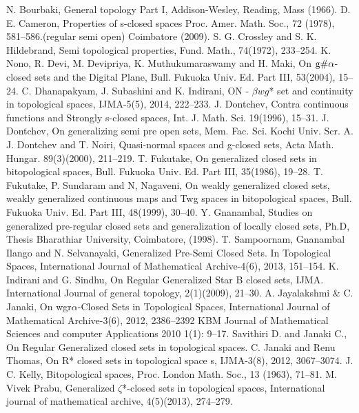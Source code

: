 \begin{thebibliography}{99}
 N. Bourbaki, General topology Part I, Addison-Wesley, Reading, Mass (1966).
 D. E. Cameron, Properties of s-closed spaces Proc. Amer. Math. Soc., 72 (1978), 581--586.(regular semi open) Coimbatore (2009).
 S. G. Crossley and S. K. Hildebrand, Semi topological properties, Fund. Math., 74(1972), 233--254.
 K. Nono, R. Devi, M. Devipriya, K. Muthukumaraswamy and H. Maki, On $\mathrm{g}\#\alpha$-closed sets and the Digital Plane, Bull. Fukuoka Univ. Ed. Part III, 53(2004), 15--24.
 C. Dhanapakyam, J. Subashini and K. Indirani, ON - $\beta wg$* set and continuity in topological spaces, IJMA-5(5), 2014, 222--233.
 J. Dontchev, Contra continuous functions and Strongly s-closed spaces, Int. J. Math. Sci. 19(1996), 15--31.
 J. Dontchev, On generalizing semi pre open sets, Mem. Fac. Sci. Kochi Univ. Scr. A. 
 J. Dontchev and T. Noiri, Quasi-normal spaces and g-closed sets, Acta Math. Hungar. 89(3)(2000), 211--219.
 T. Fukutake, On generalized closed sets in bitopological spaces, Bull. Fukuoka Univ. Ed. Part III, 35(1986), 19--28.
 T. Fukutake, P. Sundaram and N, Nagaveni, On weakly generalized closed sets, weakly generalized continuous maps and Twg spaces in bitopological spaces, Bull. Fukuoka Univ. Ed. Part III, 48(1999), 30--40.
 Y. Gnanambal, Studies on generalized pre-regular closed sets and generalization of locally closed sets, Ph.D, Thesis Bharathiar University, Coimbatore, (1998).
 T. Sampoornam, Gnanambal Ilango and N. Selvanayaki, Generalized Pre-Semi Closed Sets. In Topological Spaces, International Journal of Mathematical Archive-4(6), 2013, 151--154.
 K. Indirani and G. Sindhu, On Regular Generalized Star B closed sets, IJMA. International Journal of general topology, 2(1)(2009), 21--30.
 A. Jayalakshmi  \& C. Janaki, On wgr$\alpha$-Closed Sets in Topological Spaces, International Journal of Mathematical Archive-3(6), 2012, 2386--2392 KBM  Journal of Mathematical Sciences and computer Applications 2010 1(1): 9--17.
 Savithiri D. and Janaki C., On Regular Generalized closed sets in topological spaces.
 C. Janaki and Renu Thomas, On R* closed sets in topological space s, IJMA-3(8), 2012, 3067--3074.
 J. C. Kelly, Bitopological spaces, Proc. London Math. Soc., 13 (1963), 71--81.
 M. Vivek Prabu, Generalized $\zeta$*-closed sets in topological spaces, International journal of mathematical archive, 4(5)(2013), 274--279.

\end{thebibliography}
